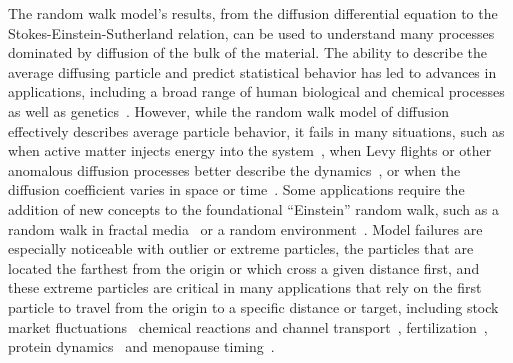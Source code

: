 The random walk model's results, from the diffusion differential equation to the Stokes-Einstein-Sutherland relation, can be used to understand many processes dominated by diffusion of the bulk of the material. The ability to describe the average diffusing particle and predict statistical behavior has led to advances in applications, including a broad range of human biological and chemical processes~\cite{kao_virus_2006,le_bihan_mr_1986,le_bihan_diffusion_2014,abdel_razek_apparent_2019,sykova_diffusion_2008,nicholson_extracellular_1998,nicholson_diffusion_2001,wijman_prognostic_2009} as well as genetics~\cite{feller_diffusion_1951,wakeley_limits_2005,ewens_mathematical_2012,waxman_diffusion_2017}. 
However, while the random walk model of diffusion effectively describes average particle behavior, it fails in many situations, such as when active matter injects energy into the system~\cite{kanazawa_loopy_2020,ramaswamy_mechanics_2010}, when Levy flights or other anomalous diffusion processes better describe the dynamics~\cite{ghosh_non-universal_2015,wang_when_2012,bouchaud_anomalous_1990,metzler_brownian_2019}, or when the diffusion coefficient varies in space or time~\cite{das_non-fickian_1998}. 
Some applications require the addition of new concepts to the foundational ``Einstein'' random walk, such as a random walk in fractal media~\cite{hentschel_relative_1984,condamin_first-passage_2007} or a random environment~\cite{barraquand_random-walk_2017,le_doussal_diffusion_2017}. 
Model failures are especially noticeable with outlier or extreme particles, the particles that are located the farthest from the origin or which cross a given distance first, and these extreme particles are critical in many applications that rely on the first particle to travel from the origin to a specific distance or target, including stock market fluctuations~\cite{barney_first-passage-time_2017,liu_anchoring_2017} chemical reactions and channel transport~\cite{redner_guide_2001,iyer-biswas_first_2015}, fertilization~\cite{grebenkov_escape_2017,grebenkov_molecular_2021}, protein dynamics~\cite{polizzi_mean_2016} and menopause timing~\cite{lawley_slowest_2023}. 

